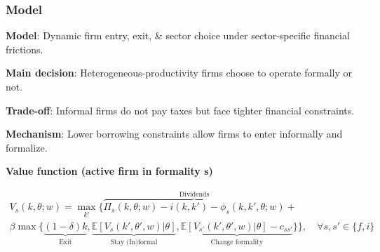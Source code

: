 \documentclass[aspectratio=169]{beamer}
\begin{document}
\begin{frame}
\frametitle{Model}\label{model}

\textbf{Model}: Dynamic firm entry, exit, \& sector choice under sector-specific financial frictions.

\vspace{2mm}
\pause

\textbf{Main decision}: Heterogeneous-productivity firms choose to operate formally or not.

\vspace{2mm}
\pause

\textbf{Trade-off}: Informal firms do not pay taxes but face tighter financial constraints. 

\vspace{2mm}
\pause

\textbf{Mechanism}: Lower borrowing constraints allow firms to enter informally and formalize.

\vspace{2mm}
\pause

\begin{center}
    \large \textbf{Value function (active firm in formality s)}
\end{center}

\vspace{-5mm}

\begin{multline*}
    V_s(k, \theta; w) = \max\limits_{k'} \{ \overbrace{ \Pi_s(k,\theta;w) - i(k,k') - \phi_s(k,k',\theta;w)}^{\text{Dividends}} + \\ 
    \beta \max \{ \underbrace{(1 - \delta) k}_{\text{Exit}} , \underbrace{\mathbb{E}[V_s(k',\theta',w) \vert \theta]}_{{\text{Stay (In)formal}}} , \underbrace{\mathbb{E}[V_{s'}(k',\theta',w) \vert \theta] - c_{ss'}}_{\text{Change formality}} \} \}, \quad \forall s,s' \in \{f,i\}
\end{multline*}

\vspace{5mm}

\hyperlink{settings}{} \hyperlink{timing}{} \hyperlink{value_functions}{} \hyperlink{decision_rules}{} \hyperlink{threshold}{} \hyperlink{inactive}{} \hyperlink{model_estimation}{}

\end{frame}
\end{document}
